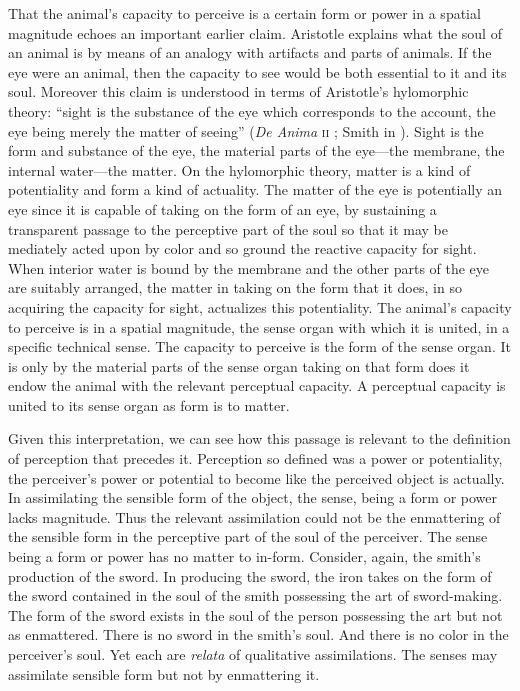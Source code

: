 That the animal's capacity to perceive is a certain form or power in a spatial magnitude echoes an important earlier claim. Aristotle explains what the soul of an animal is by means of an analogy with artifacts and parts of animals. If the eye were an animal, then the capacity to see would be both essential to it and its soul. Moreover this claim is understood in terms of Aristotle's hylomorphic theory: ``sight is the substance of the eye which corresponds to the account, the eye being merely the matter of seeing'' (\emph{De Anima} \textsc{ii} ; Smith in \citealt[]{Barnes:1984uq}). Sight is the form and substance of the eye, the material parts of the eye---the membrane, the internal water---the matter. On the hylomorphic theory, matter is a kind of potentiality and form a kind of actuality. The matter of the eye is potentially an eye since it is capable of taking on the form of an eye, by sustaining a transparent passage to the perceptive part of the soul so that it may be mediately acted upon by color and so ground the reactive capacity for sight. When interior water is bound by the membrane and the other parts of the eye are suitably arranged, the matter in taking on the form that it does, in so acquiring the capacity for sight, actualizes this potentiality. The animal's capacity to perceive is in a spatial magnitude, the sense organ with which it is united, in a specific technical sense. The capacity to perceive is the form of the sense organ. It is only by the material parts of the sense organ taking on that form does it endow the animal with the relevant perceptual capacity. A perceptual capacity is united to its sense organ as form is to matter.

Given this interpretation, we can see how this passage is relevant to the definition of perception that precedes it. Perception so defined was a power or potentiality, the perceiver's power or potential to become like the perceived object is actually. In assimilating the sensible form of the object, the sense, being a form or power lacks magnitude. Thus the relevant assimilation could not be the enmattering of the sensible form in the perceptive part of the soul of the perceiver. The sense being a form or power has no matter to in-form. Consider, again, the smith's production of the sword. In producing the sword, the iron takes on the form of the sword contained in the soul of the smith possessing the art of sword-making. The form of the sword exists in the soul of the person possessing the art but not as enmattered. There is no sword in the smith's soul. And there is no color in the perceiver's soul. Yet each are \emph{relata} of qualitative assimilations. The senses may assimilate sensible form but not by enmattering it.

